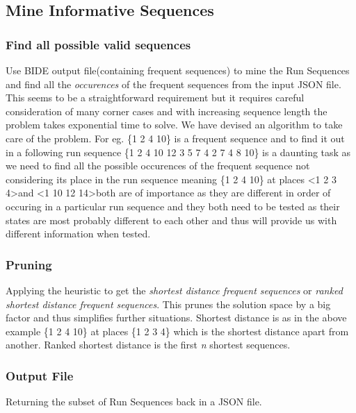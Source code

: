 \subsection{Mine Informative Sequences}

\subsubsection{Find all possible valid sequences}
 Use BIDE output file(containing frequent sequences) to mine the Run Sequences and find all the \textit{occurences} of the frequent sequences from the input JSON file. This seems to be a straightforward requirement but it requires careful consideration of many corner cases and with increasing sequence length the problem takes exponential time to solve. We have devised an algorithm to take care of the problem.
 For eg. \{1 2 4 10\} is a frequent sequence and to find it out in a following run sequence \{1 2 4 10 12 3 5 7 4 2 7 4 8 10\} is a daunting task as we need to find all the possible occurences of the frequent sequence not considering its place in the run sequence meaning \{1 2 4 10\} at places \textless1 2 3 4\textgreater and \textless1 10 12 14\textgreater both are of importance as they are different in order of occuring in a particular run sequence and they both need to be tested as their states are most probably different to each other and thus will provide us with different information when tested.
\subsubsection{Pruning}
Applying the heuristic to get the \textit{shortest distance frequent sequences} or \textit{ranked shortest distance frequent sequences}. This prunes the solution space by a big factor and thus simplifies further situations.
Shortest distance is as in the above example \{1 2 4 10\} at places \{1 2 3 4\} which is the shortest distance apart from another.
Ranked shortest distance is the first \textit{n} shortest sequences.
\subsubsection{Output File}
Returning the subset of Run Sequences back in a JSON file.



